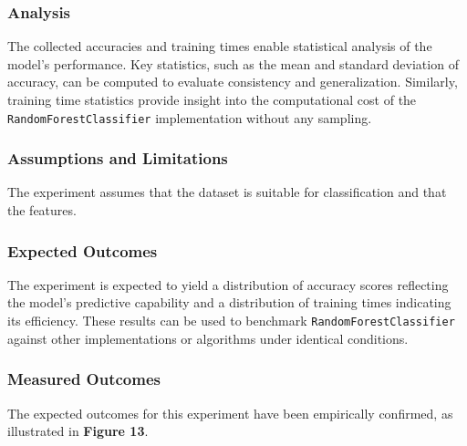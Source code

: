 \documentclass{article}
\theoremstyle{plain}
\theoremstyle{definition}
\theoremstyle{remark}
\begin{document}
\subsubsection{Analysis}

The collected accuracies and training times enable statistical analysis of the model's performance. Key statistics, such as the mean and standard deviation of accuracy, can be computed to evaluate consistency and generalization. Similarly, training time statistics provide insight into the computational cost of the \texttt{RandomForestClassifier} implementation without any sampling.


\subsubsection{Assumptions and Limitations}

The experiment assumes that the dataset is suitable for classification and that the features.


\subsubsection{Expected Outcomes}

The experiment is expected to yield a distribution of accuracy scores reflecting the model's predictive capability and a distribution of training times indicating its efficiency. These results can be used to benchmark \texttt{RandomForestClassifier} against other implementations or algorithms under identical conditions.

\subsubsection{Measured Outcomes}

The expected outcomes for this experiment have been empirically confirmed, as illustrated in \textbf{Figure 13}.
\end{document}
